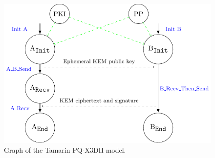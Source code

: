 
\begin{figure}[htbp]
    \centering
    \includegraphics[scale=0.85]{Graph_X3DH.pdf}
    \caption{Graph of the Tamarin PQ-X3DH model.}
    \label{fig:GraphX3DH}
\end{figure}

